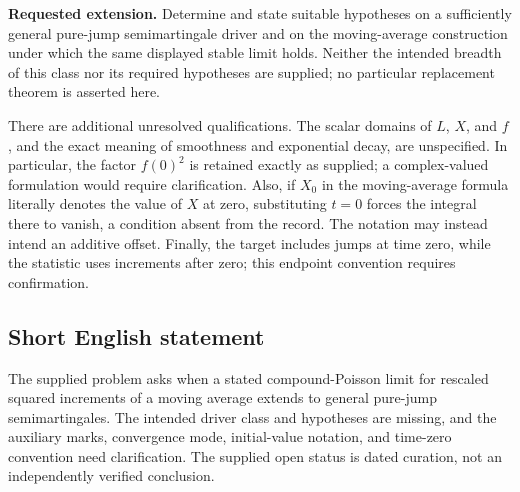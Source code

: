 \documentclass[11pt]{article}
\begin{document}
\textbf{Requested extension.} Determine and state suitable hypotheses on a sufficiently general pure-jump semimartingale driver and on the moving-average construction under which the same displayed stable limit holds. Neither the intended breadth of this class nor its required hypotheses are supplied; no particular replacement theorem is asserted here.

There are additional unresolved qualifications. The scalar domains of \(L\), \(X\), and \(f\), and the exact meaning of smoothness and exponential decay, are unspecified. In particular, the factor \(f(0)^2\) is retained exactly as supplied; a complex-valued formulation would require clarification. Also, if \(X_0\) in the moving-average formula literally denotes the value of \(X\) at zero, substituting \(t=0\) forces the integral there to vanish, a condition absent from the record. The notation may instead intend an additive offset. Finally, the target includes jumps at time zero, while the statistic uses increments after zero; this endpoint convention requires confirmation.
\subsection{Short English statement}
The supplied problem asks when a stated compound-Poisson limit for rescaled squared increments of a moving average extends to general pure-jump semimartingales. The intended driver class and hypotheses are missing, and the auxiliary marks, convergence mode, initial-value notation, and time-zero convention need clarification. The supplied open status is dated curation, not an independently verified conclusion.
\end{document}
